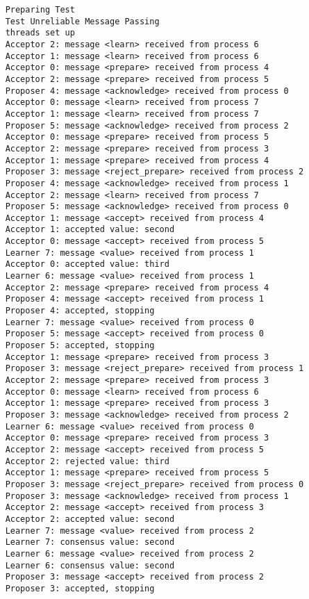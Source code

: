\documentclass[a4paper, 12pt]{article}
\begin{document}
\begin{lstlisting}
    Preparing Test
    Test Unreliable Message Passing
    threads set up
    Acceptor 2: message <learn> received from process 6
    Acceptor 1: message <learn> received from process 6
    Acceptor 0: message <prepare> received from process 4
    Acceptor 2: message <prepare> received from process 5
    Proposer 4: message <acknowledge> received from process 0
    Acceptor 0: message <learn> received from process 7
    Acceptor 1: message <learn> received from process 7
    Proposer 5: message <acknowledge> received from process 2
    Acceptor 0: message <prepare> received from process 5
    Acceptor 2: message <prepare> received from process 3
    Acceptor 1: message <prepare> received from process 4
    Proposer 3: message <reject_prepare> received from process 2
    Proposer 4: message <acknowledge> received from process 1
    Acceptor 2: message <learn> received from process 7
    Proposer 5: message <acknowledge> received from process 0
    Acceptor 1: message <accept> received from process 4
    Acceptor 1: accepted value: second
    Acceptor 0: message <accept> received from process 5
    Learner 7: message <value> received from process 1
    Acceptor 0: accepted value: third
    Learner 6: message <value> received from process 1
    Acceptor 2: message <prepare> received from process 4
    Proposer 4: message <accept> received from process 1
    Proposer 4: accepted, stopping
    Learner 7: message <value> received from process 0
    Proposer 5: message <accept> received from process 0
    Proposer 5: accepted, stopping
    Acceptor 1: message <prepare> received from process 3
    Proposer 3: message <reject_prepare> received from process 1
    Acceptor 2: message <prepare> received from process 3
    Acceptor 0: message <learn> received from process 6
    Acceptor 1: message <prepare> received from process 3
    Proposer 3: message <acknowledge> received from process 2
    Learner 6: message <value> received from process 0
    Acceptor 0: message <prepare> received from process 3
    Acceptor 2: message <accept> received from process 5
    Acceptor 2: rejected value: third
    Acceptor 1: message <prepare> received from process 5
    Proposer 3: message <reject_prepare> received from process 0
    Proposer 3: message <acknowledge> received from process 1
    Acceptor 2: message <accept> received from process 3
    Acceptor 2: accepted value: second
    Learner 7: message <value> received from process 2
    Learner 7: consensus value: second
    Learner 6: message <value> received from process 2
    Learner 6: consensus value: second
    Proposer 3: message <accept> received from process 2
    Proposer 3: accepted, stopping
\end{lstlisting}

\end{document}
